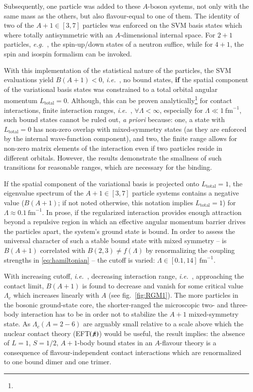 \documentclass[preprint,12pt]{elsarticle}
\newcommand{\eg}{\textit{e.g.}~}
\newcommand{\ie}{\textit{i.e.}~}
\newcommand{\eftnopi}{\mbox{EFT$(\not \! \pi)$}}
\newcommand{\figref}[1]{fig.~\ref{#1}}
\begin{document}
Subsequently, one particle was added to these $A$-boson systems, not only with the same mass as the others, but also 
flavour-equal to one of them.
The identity of two of the $A+1\in[3,7]$ particles was enforced on the SVM basis states which where totally
antisymmetric with an $A$-dimensional internal space. For $2+1$ particles, \eg, the spin-up/down states of a neutron suffice,
while for $4+1$, the spin and isospin formalism can be invoked.

With this implementation of the statistical nature of the particles, the SVM evaluations yield $B(A+1)<0$, \ie, no bound 
states,
{\bf if} the spatial component of the variational basis states was constrained to
a total orbital angular momentum $L_\text{total}=0$.
Although, this can be proven analytically\footnote{} for contact interactions,
finite interaction ranges, \ie, $\forall\Lambda<\infty$, especially for $\Lambda\ll 1~\text{fm}^{-1}$, such 
bound states cannot be ruled out, {\it a priori} because: one, a state with $L_\text{total}=0$ has non-zero overlap with 
mixed-symmetry states (as they are enforced by the internal wave-function component), and two, the finite range allows for 
non-zero matrix elements of the interaction even if two particles reside in different orbitals.
However, the results demonstrate the smallness of such transitions for reasonable ranges,
which are necessary for the binding.

If the spatial component of the variational basis is projected onto $L_\text{total}=1$, the eigenvalue spectrum of
the $A+1\in[3,7]$ particle systems contains a negative value ($B(A+1)$; if not noted otherwise, this notation
implies $L_\text{total}=1$) for $\Lambda\approx0.1~\text{fm}^{-1}$.
In prose, if the regularized interaction provides enough attraction beyond a repulsive region in which an effective
angular momentum barrier drives the particles apart, the system's ground state is bound.
In order to assess the universal character of such a stable bound state with mixed symmetry -- is $B(A+1)$ correlated
with $B(2,3)\neq f(\Lambda)$ by renormalizing the coupling strengths in \eqref{eq:hamiltonian} -- the cutoff
is varied: $\Lambda\in[0.1,14]~\text{fm}^{-1}$.

With increasing cutoff, \ie, decreasing interaction range, \ie, approaching the contact limit, $B(A+1)$ is found to decrease
and vanish for some critical value $\Lambda_c$ which increases linearly with $A$ (see \figref{fig:RGM1}).
The more particles in the bosonic ground-state core, the shorter-ranged the microscopic two- and three-body interaction
has to be in order not to stabilize the $A+1$ mixed-symmetry state.
As $\Lambda_c(A=2-6)$ are arguably small relative to a scale above which the nuclear contact theory (\eftnopi) would
be useful, the result implies: the absence of $L=1$, $S=1/2$, $A+1$-body bound states in an $A$-flavour theory
is a consequence of flavour-independent contact interactions which are renormalized to one bound dimer and one trimer. 
\end{document}
